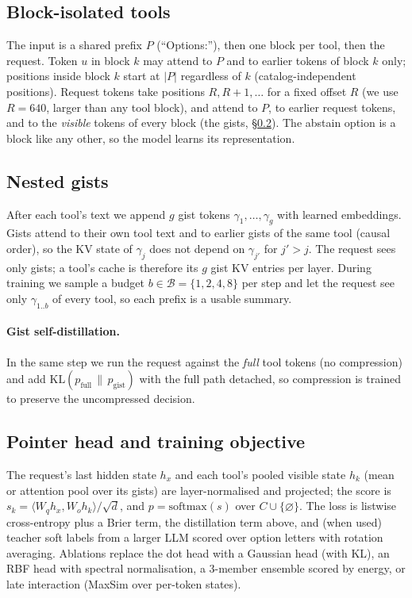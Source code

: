 \documentclass[sigconf,review,anonymous]{acmart}
\begin{document}
\subsection{Block-isolated tools}\label{sec:block}
The input is a shared prefix $P$ (``Options:''), then one block per tool, then the request.
Token $u$ in block $k$ may attend to $P$ and to earlier tokens of block $k$ only; positions inside block $k$ start at $|P|$ regardless of $k$ (catalog-independent positions).
Request tokens take positions $R, R{+}1,\dots$ for a fixed offset $R$ (we use $R{=}640$, larger than any tool block), and attend to $P$, to earlier request tokens, and to the \emph{visible} tokens of every block (the gists, \S\ref{sec:gist}).
The abstain option is a block like any other, so the model learns its representation.

\subsection{Nested gists}\label{sec:gist}
After each tool's text we append $g$ gist tokens $\gamma_1,\dots,\gamma_g$ with learned embeddings.
Gists attend to their own tool text and to earlier gists of the same tool (causal order), so the KV state of $\gamma_j$ does not depend on $\gamma_{j'}$ for $j'>j$.
The request sees only gists; a tool's cache is therefore its $g$ gist KV entries per layer.
During training we sample a budget $b\in\mathcal{B}=\{1,2,4,8\}$ per step and let the request see only $\gamma_{1..b}$ of every tool, so each prefix is a usable summary.

\paragraph{Gist self-distillation.} In the same step we run the request against the \emph{full} tool tokens (no compression) and add $\mathrm{KL}(p_\text{full}\,\|\,p_\text{gist})$ with the full path detached, so compression is trained to preserve the uncompressed decision.

\subsection{Pointer head and training objective}
The request's last hidden state $h_x$ and each tool's pooled visible state $h_k$ (mean or attention pool over its gists) are layer-normalised and projected; the score is $s_k=\langle W_q h_x, W_o h_k\rangle/\sqrt{d}$, and $p=\mathrm{softmax}(s)$ over $C\cup\{\varnothing\}$.
The loss is listwise cross-entropy plus a Brier term, the distillation term above, and (when used) teacher soft labels from a larger LLM scored over option letters with rotation averaging.
Ablations replace the dot head with a Gaussian head (with KL), an RBF head with spectral normalisation, a 3-member ensemble scored by energy, or late interaction (MaxSim over per-token states).
\end{document}
